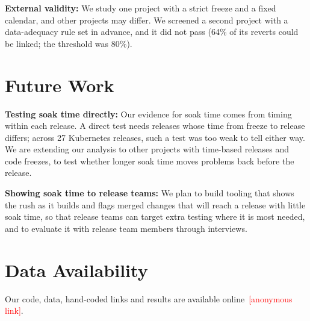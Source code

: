 \documentclass[10pt,conference]{IEEEtran}
\newcommand{\tbd}[1]{\textcolor{red}{#1}}
\begin{document}
\textbf{External validity:} We study one project with a strict freeze and a fixed calendar, and other projects may differ. We screened a second project with a data-adequacy rule set in advance, and it did not pass (64\% of its reverts could be linked; the threshold was 80\%).

\section{Future Work}

\textbf{Testing soak time directly:} Our evidence for soak time comes from timing within each release. A direct test needs releases whose time from freeze to release differs; across 27 Kubernetes releases, such a test was too weak to tell either way. We are extending our analysis to other projects with time-based releases and code freezes, to test whether longer soak time moves problems back before the release.

\textbf{Showing soak time to release teams:} We plan to build tooling that shows the rush as it builds and flags merged changes that will reach a release with little soak time, so that release teams can target extra testing where it is most needed, and to evaluate it with release team members through interviews.

\section{Data Availability}

Our code, data, hand-coded links and results are available online~\tbd{[anonymous link]}.



\end{document}
